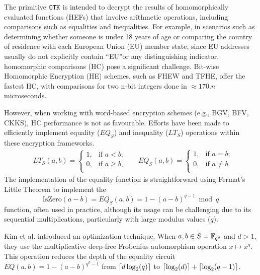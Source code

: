 The primitive $\mathtt{OTK}$ is intended to decrypt the results of homomorphically evaluated functions (HEFs) that involve arithmetic operations, including comparisons such as equalities and inequalities. For example, in scenarios such as determining whether someone is under 18 years of age or comparing the country of residence with each European Union (EU) member state, since EU addresses usually do not explicitly contain ``EU''or any distinguishing indicator, homomorphic comparisons (HC) pose a significant challenge. Bit-wise Homomorphic Encryption (HE) schemes, such as FHEW and TFHE, offer the fastest HC, with comparisons for two n-bit integers done in $\approx170.n$ microseconds\cite{chillottiFasterPackedHomomorphic2017,chillottiTFHEFastFully2020}.

However, when working with word-based encryption schemes (e.g., BGV, BFV, CKKS), HC performance is not as favourable. Efforts have been made to efficiently implement equality ($EQ_S$) and inequality ($LT_S$) operations within these encryption frameworks. 
\begin{align*}
    &LT_S(a,b) = 
    \begin{cases}
      1, & \text{if } a < b; \\
      0, & \text{if } a \ge b, \\
    \end{cases}   
    &&EQ_S(a,b) = 
    \begin{cases}
      1, & \text{if } a = b; \\
      0, & \text{if } a \neq b. \\
    \end{cases}
  \end{align*}
The implementation of the equality function is straightforward using Fermat's Little Theorem to implement the 
\begin{equation}\label{eq:iszero}
    \mathrm{IsZero}(a-b)=EQ_S(a,b)= 1 - (a-b)^{q-1} \bmod q
\end{equation}
function, often used in practice, although its usage can be challenging due to its sequential multiplications, particularly with large modulus values ($q$).

Kim et al. \cite{kimEfficiencyFHEbasedPrivate2016} introduced an optimization technique. When $a,b \in S=\mathbb{F}_{q^d}$ and $d>1$, they use the multiplicative deep-free Frobenius automorphism operation $x \mapsto x^{q}$. This operation reduces the depth of the equality circuit $EQ(a,b) = 1 - (a-b)^{q^{d}-1}$ from $\left\lceil d\log_2(q) \right\rceil$ to $\left\lceil \log_2(d) \right\rceil + \left\lceil \log_2(q-1) \right\rceil$.

